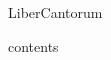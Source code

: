 \documentclass[a5paper,11pt]{book}
\begin{document}
\begin{titlepage}
    \begin{center}
        \Huge{LiberCantorum}
    \end{center}
\end{titlepage}

\setcounter{secnumdepth}{-1}
\tableofcontents

{{ contents }}
\end{document}
